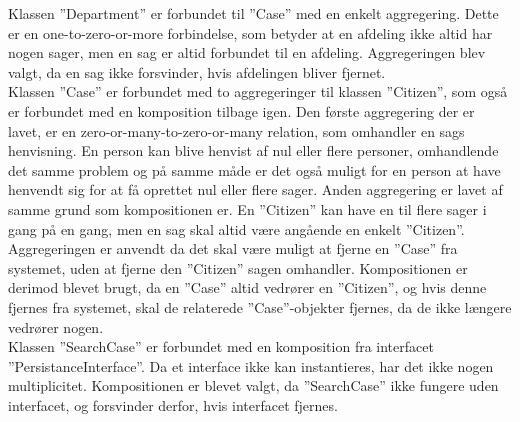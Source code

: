 Klassen ”Department” er forbundet til ”Case” med en enkelt aggregering. Dette er en one-to-zero-or-more forbindelse, som betyder at en afdeling ikke altid har nogen sager, men en sag er altid forbundet til en afdeling. Aggregeringen blev valgt, da en sag ikke forsvinder, hvis afdelingen bliver fjernet. \\
Klassen ”Case” er forbundet med to aggregeringer til klassen ”Citizen”, som også er forbundet med en komposition tilbage igen. Den første aggregering der er lavet, er en zero-or-many-to-zero-or-many relation, som omhandler en sags henvisning. En person kan blive henvist af nul eller flere personer, omhandlende det samme problem og på samme måde er det også muligt for en person at have henvendt sig for at få oprettet nul eller flere sager. Anden aggregering er lavet af samme grund som kompositionen er. En ”Citizen” kan have en til flere sager i gang på en gang, men en sag skal altid være angående en enkelt ”Citizen”. Aggregeringen er anvendt da det skal være muligt at fjerne en ”Case” fra systemet, uden at fjerne den ”Citizen” sagen omhandler. Kompositionen er derimod blevet brugt, da en ”Case” altid vedrører en ”Citizen”, og hvis denne fjernes fra systemet, skal de relaterede ”Case”-objekter fjernes, da de ikke længere vedrører nogen.\\
Klassen ”SearchCase” er forbundet med en komposition fra interfacet ”PersistanceInterface”. Da et interface ikke kan instantieres, har det ikke nogen multiplicitet. Kompositionen er blevet valgt, da ”SearchCase” ikke fungere uden interfacet, og forsvinder derfor, hvis interfacet fjernes.